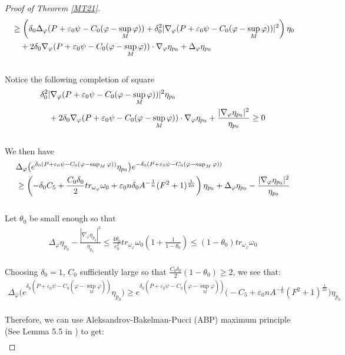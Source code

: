 \documentclass[11pt]{amsart}
\numberwithin{equation}{section}
\begin{document}
\begin{proof}[Proof of Theorem \ref{MT21}]
\begin{align}
	&\ge \left( \delta_0\Delta_{\varphi}(P+\varepsilon_0\psi-C_0(\varphi-\sup_M\varphi)) +\delta_0^2|\nabla_{\varphi}(P+\varepsilon_0\psi-C_0(\varphi-\sup_M\varphi))|^2\right)\eta_0 \notag \\
	&\quad+2\delta_0\nabla_{\varphi}(P+\varepsilon_0\psi-C_0(\varphi-\sup_M\varphi)) \cdot \nabla_{\varphi}\eta_{p_0}+\Delta_{\varphi}\eta_{p_0}  
\end{align}\\
Notice the following completion of square 
\begin{align}
	&\delta_0^2|\nabla_{\varphi}(P+\varepsilon_0\psi-C_0(\varphi-\sup_M\varphi))|^2 \eta_{p_0} \notag\\
	&\quad + 2\delta_0\nabla_{\varphi}(P+\varepsilon_0\psi-C_0(\varphi-\sup_M\varphi)) \cdot \nabla_{\varphi}\eta_{p_0} + \frac{|\nabla_\varphi\eta_{p_0}|^2}{\eta_{p_0}} \ge  0
\end{align}\\
We then have 
\begin{align}
	&\Delta_{\varphi}\big(e^{\delta_0(P+\varepsilon_0\psi-C_0(\varphi-\sup_M\varphi))}\eta_{p_0}\big) e^{-\delta_0(P+\varepsilon_0\psi-C_0(\varphi-\sup_M\varphi))}\notag\\
	& \ge  \left( -\delta_0C_5 +\frac{C_0\delta_0}{2}tr_{\omega_{\varphi}}\omega_0 +\varepsilon_0n\delta_0A^{-\frac{1}{n}}(F^2+1)^{\frac{1}{2n}}\right)\eta_{p_0} +\Delta_\varphi\eta_{p_0} - \frac{|\nabla_\varphi\eta_{p_0}|^2}{\eta_{p_0}} 
\end{align}\\
Let $\theta_0$ be small enough so that 
\begin{align}
	\Delta_\varphi\eta_{p_0} - \frac{|\nabla_\varphi\eta_{p_0}|^2}{\eta_{p_0}} \le  \frac{4\theta_0}{r_0^2}tr_{\omega_{\varphi}}\omega_0 (1+\frac{1}{1-\theta_0} ) \le  (1-\theta_0) tr_{\omega_{\varphi}}\omega_0
\end{align}\\
Choosing $\delta_0=1$, $C_0$ sufficiently large so that $\frac{C_0\delta_0}{2}(1-\theta_0) \ge  2$, we see that:
\begin{align}
	\Delta_{\varphi}\big(e^{\delta_0(P+\varepsilon_0\psi-C_0(\varphi-\sup_M\varphi))}\eta_{p_0} \big) \ge  e^{\delta_0(P+\varepsilon_0\psi-C_0(\varphi-\sup_M\varphi))} \Big(-C_5+\varepsilon_0n A^{-\frac{1}{n}}(F^2+1)^{\frac{1}{2n}}\Big)\eta_{p_0}
\end{align}\\
Therefore, we can use Aleksandrov-Bakelman-Pucci (ABP) maximum principle (See Lemma 5.5 in \cite{cc1}) to get:
\begin{align}

\end{align}
\end{proof}
\end{document}
